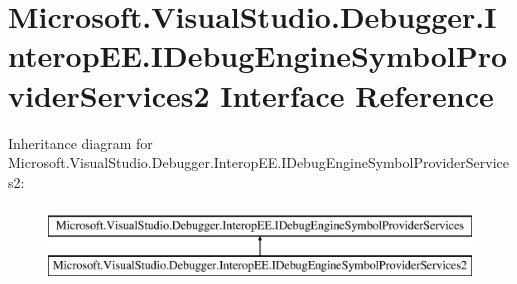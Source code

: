 \hypertarget{interface_microsoft_1_1_visual_studio_1_1_debugger_1_1_interop_e_e_1_1_i_debug_engine_symbol_provider_services2}{\section{Microsoft.\+Visual\+Studio.\+Debugger.\+Interop\+E\+E.\+I\+Debug\+Engine\+Symbol\+Provider\+Services2 Interface Reference}
\label{interface_microsoft_1_1_visual_studio_1_1_debugger_1_1_interop_e_e_1_1_i_debug_engine_symbol_provider_services2}
}
Inheritance diagram for Microsoft.\+Visual\+Studio.\+Debugger.\+Interop\+E\+E.\+I\+Debug\+Engine\+Symbol\+Provider\+Services2\+:\begin{figure}[H]
\begin{center}
\leavevmode
\includegraphics[height=2.000000cm]{interface_microsoft_1_1_visual_studio_1_1_debugger_1_1_interop_e_e_1_1_i_debug_engine_symbol_provider_services2}
\end{center}
\end{figure}
